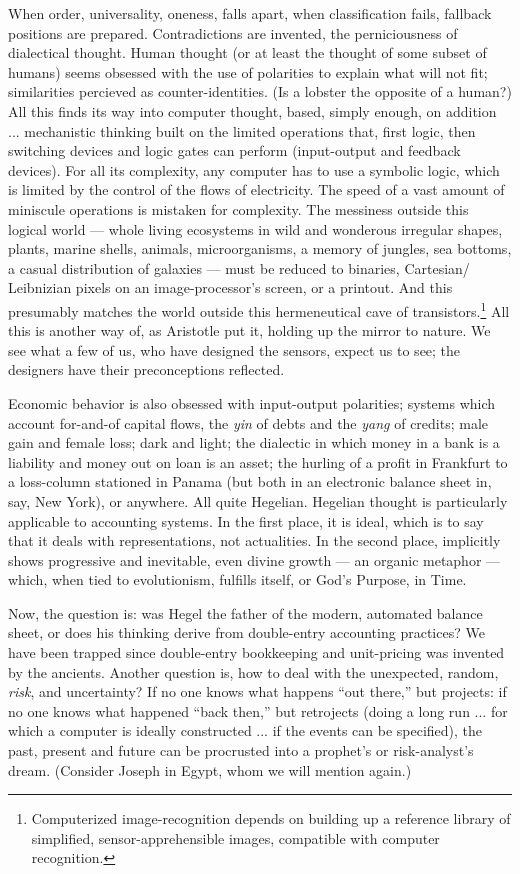\documentclass[11pt,twoside,draft]{memoir}
\begin{document}
When order, universality, oneness,
falls apart, when classification fails,
fallback positions are prepared. Contradictions are
invented, the perniciousness of dialectical
thought. Human thought (or at least the
thought of some subset of humans) seems
obsessed with the use of polarities to explain
what will not fit; similarities percieved as
counter-identities. (Is a lobster the opposite
of a human?) All this finds its way into
computer thought, based, simply enough,
on addition ... mechanistic thinking built
on the limited operations that, first logic,
then switching devices and logic gates can
perform (input-output and feedback devices).
For all its complexity, any computer has to
use a symbolic logic, which is limited by the
control of the flows of electricity. The speed
of a vast amount of miniscule operations is
mistaken for complexity. The messiness outside this logical world --- 
whole living ecosystems in wild and wonderous irregular
shapes, plants, marine shells, animals,
microorganisms, a memory of jungles, sea
bottoms, a casual distribution of galaxies --- 
must be reduced to binaries, Cartesian\slash
Leibnizian pixels on an image-processor's
screen, or a printout. And this presumably
matches the world outside this hermeneutical cave 
of transistors.\footnote{Computerized image-recognition depends on building up a reference library of simplified, sensor-apprehensible images, compatible with computer recognition.} 
All this is another way of, as
Aristotle put it, holding up the mirror to
nature. We see what a few of us, who have
designed the sensors, expect us to see; the
designers have their preconceptions reflected.

Economic behavior is also obsessed with
input-output polarities; systems which account for-and-of capital flows, the \emph{yin} of
debts and the \emph{yang} of credits; male gain and
female loss; dark and light; the dialectic in
which money in a bank is a liability and
money out on loan is an asset; the hurling of
a profit in Frankfurt to a loss-column stationed in Panama (but both in an electronic
balance sheet in, say, New York), or anywhere. All quite Hegelian. Hegelian thought
is particularly applicable to accounting systems. In the first place, it is ideal, which is to
say that it deals with representations, not actualities. In the second place, implicitly
shows progressive and inevitable, even divine growth --- an organic metaphor --- which,
when tied to evolutionism, fulfills itself, or God's Purpose, in Time.

Now, the question is: was Hegel the father of the modern, automated balance sheet, or
does his thinking derive from double-entry accounting practices? We have been trapped
since double-entry bookkeeping and unit-pricing was invented by the ancients. Another
question is, how to deal with the unexpected,
random, \emph{risk}, and uncertainty?
If no one knows what happens \enquote{out there,} but projects: if no one knows what happened 
\enquote{back then,} but retrojects (doing a long run ... for
which a computer is ideally constructed ...
if the events can be specified), the past,
present and future can be procrusted into a
prophet's or risk-analyst's dream. (Consider
Joseph in Egypt, whom we will mention again.)
\end{document}
